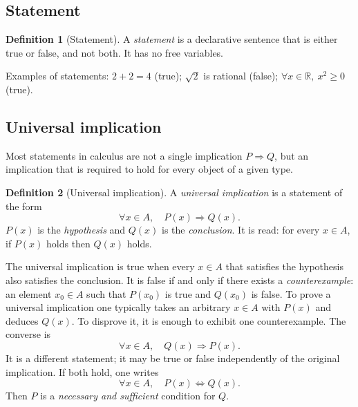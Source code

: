 \documentclass[11pt,a4paper]{article}
\theoremstyle{definition} \newtheorem{definition}{Definition} \theoremstyle{plain} \newtheorem{theorem}{Theorem}
\begin{document}
\subsection{Statement}
\begin{definition}[Statement] A \emph{statement} is a declarative sentence that is either true or false, and not both. It has no free variables. \end{definition}
Examples of statements: $2+2=4$ (true); $\sqrt{2}$ is rational (false); $\forall x\in\mathbb{R},\ x^2\ge 0$ (true).
\subsection{Universal implication}
Most statements in calculus are not a single implication $P\Rightarrow Q$, but an implication that is required to hold for every object of a given type.
\begin{definition}[Universal implication] A \emph{universal implication} is a statement of the form
\[\boxed{ \forall x\in A,\quad P(x)\Rightarrow Q(x). }\]
$P(x)$ is the \emph{hypothesis} and $Q(x)$ is the \emph{conclusion}. It is read: for every $x\in A$, if $P(x)$ holds then $Q(x)$ holds. \end{definition}
The universal implication is true when every $x\in A$ that satisfies the hypothesis also satisfies the conclusion. It is false if and only if there exists a \emph{counterexample}: an element $x_0\in A$ such that $P(x_0)$ is true and $Q(x_0)$ is false.
To prove a universal implication one typically takes an arbitrary $x\in A$ with $P(x)$ and deduces $Q(x)$. To disprove it, it is enough to exhibit one counterexample.
The converse is
\[\boxed{ \forall x\in A,\quad Q(x)\Rightarrow P(x). }\]
It is a different statement; it may be true or false independently of the original implication. If both hold, one writes
\[\boxed{ \forall x\in A,\quad P(x)\Leftrightarrow Q(x). }\]
Then $P$ is a \emph{necessary and sufficient} condition for $Q$.
\end{document}
